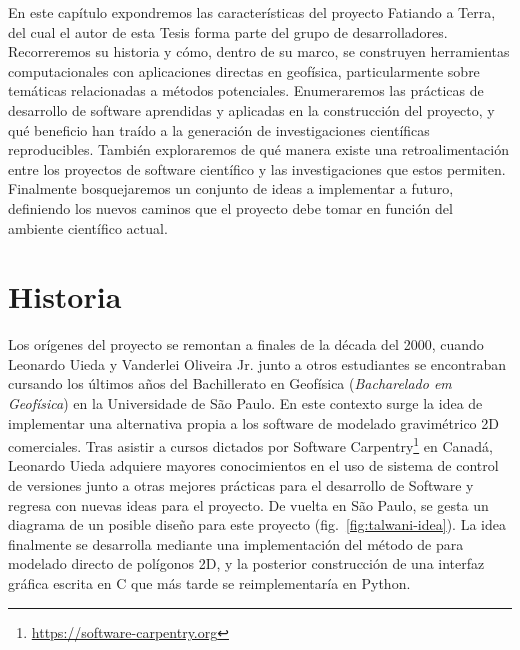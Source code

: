 En este capítulo expondremos las  características del proyecto
Fatiando a Terra, del cual el autor de esta Tesis forma parte del grupo de
desarrolladores.
Recorreremos su historia y cómo, dentro de su marco, se construyen herramientas
computacionales con aplicaciones directas en geofísica, particularmente sobre
temáticas relacionadas a métodos potenciales.
Enumeraremos las prácticas de desarrollo de software aprendidas y aplicadas en
la construcción del proyecto, y qué beneficio han traído a la generación de
investigaciones científicas reproducibles.
También exploraremos de qué manera existe una retroalimentación entre los
proyectos de software científico y las investigaciones que estos permiten.
Finalmente bosquejaremos un conjunto de ideas a implementar a futuro,
definiendo los nuevos caminos que el proyecto debe tomar en función del
ambiente científico actual.


\section{Historia}
\label{sec:fatiando-history}

Los orígenes del proyecto se remontan a finales de la década del 2000, cuando
Leonardo Uieda y Vanderlei Oliveira Jr. junto a otros estudiantes se
encontraban cursando los últimos años del Bachillerato en Geofísica
(\emph{Bacharelado em Geofísica}) en la Universidade de São Paulo.
En este contexto surge la idea de implementar una alternativa propia a los
software de modelado gravimétrico 2D comerciales.
Tras asistir a cursos dictados por
Software Carpentry\footnote{%
    \url{https://software-carpentry.org}
}
en Canadá, Leonardo Uieda adquiere mayores conocimientos en el uso de sistema
de control de versiones junto a otras mejores prácticas para el desarrollo de
Software y regresa con nuevas ideas para el proyecto.
De vuelta en São Paulo, se gesta un diagrama de un posible diseño para este
proyecto (fig.~\ref{fig:talwani-idea}).
La idea finalmente se desarrolla mediante una implementación del método de
\citet{talwani1959} para modelado directo de polígonos 2D, y la posterior
construcción de una interfaz gráfica escrita en C que más tarde se
reimplementaría en Python.

